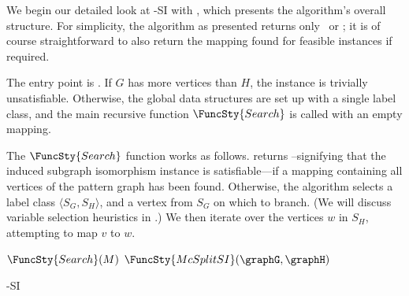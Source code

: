 We begin our detailed look at \McSplit-SI with
, which presents the algorithm's overall structure.
For simplicity, the algorithm as presented returns only \boolT\ or
\boolF; it is of course straightforward to also return the mapping found for
feasible instances if required.

The entry point is
.  If $G$ has more vertices than $H$, the instance is trivially
unsatisfiable. Otherwise, the global data structures are set up with
a single label class, and the main recursive function $\FuncSty{Search}$ is called with
an empty mapping.

The $\FuncSty{Search}$ function works as follows.
 returns \boolT\---signifying that the induced
subgraph isomorphism instance is satisfiable---if a mapping containing all
vertices of the pattern graph has been found.  Otherwise, the algorithm selects
a label class $\langle S_G, S_H \rangle$, and a vertex from $S_G$ on
which to branch.  (We will discuss variable selection heuristics in
.) We then iterate over the vertices $w$ in $S_H$,
attempting to map $v$ to $w$.

\begin{algorithm}[htb]
\AlgorithmFontSize
\DontPrintSemicolon
\nl $\FuncSty{Search}(M)$ \;
\nl {}
\;
\nl $\FuncSty{McSplitSI}(\graphG,\graphH)$ \label{McSplitSIFun} \;
\nl {}
\caption{\McSplit-SI}
\label{McSplitSIAlg}
\end{algorithm}

